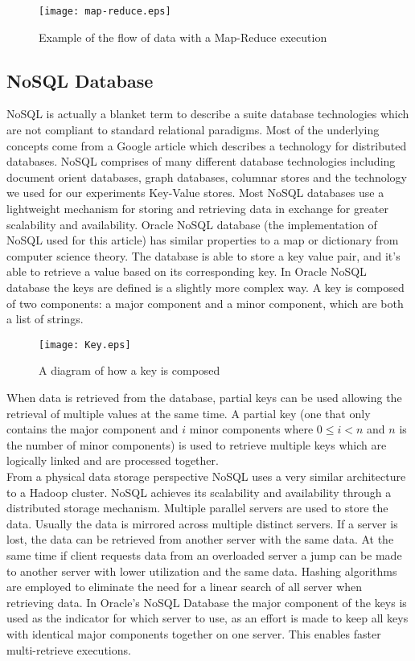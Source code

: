 \documentclass[runningheads]{llncs}
\begin{document}
\begin{figure}
\texttt{[image: map-reduce.eps]}
\caption{Example of the flow of data with a Map-Reduce execution}
\end{figure}

\subsection{NoSQL Database}

NoSQL is actually a blanket term to describe a suite database technologies which are not compliant to standard relational paradigms. Most of the underlying concepts come from a Google article \cite{Google06} which describes a technology for distributed databases. NoSQL comprises of many different database technologies including document orient databases, graph databases, columnar stores and the technology we used for our experiments Key-Value stores. Most NoSQL databases use a lightweight mechanism for storing and retrieving data in exchange for greater scalability and availability. Oracle NoSQL database (the implementation of NoSQL used for this article) has similar properties to a map or dictionary from computer science theory. The database is able to store a key value pair, and it's able to retrieve a value based on its corresponding key. In Oracle NoSQL database the keys are defined is a slightly more complex way. A key is composed of two components: a major component and a minor component, which are both a list of strings. 

\begin{figure}
\texttt{[image: Key.eps]}
\caption{A diagram of how a key is composed}
\end{figure}

When data is retrieved from the database, partial keys can be used allowing the retrieval of multiple values at the same time. A partial key (one that only contains the major component and $i$ minor components where $0 \le i <n$ and $n$ is the number of minor components) is used to retrieve multiple keys which are logically linked and are processed together. \\

From a physical data storage perspective NoSQL uses a very similar architecture to a Hadoop cluster. NoSQL achieves its scalability and availability through a distributed storage mechanism. Multiple parallel servers are used to store the data. Usually the data is mirrored across multiple distinct servers. If a server is lost, the data can be retrieved from another server with the same data. At the same time if client requests data from an overloaded server a jump can be made to another server with lower utilization and the same data. Hashing algorithms are employed to eliminate the need for a linear search of all server when retrieving data. In Oracle's NoSQL Database the major component of the keys is used as the indicator for which server to use, as an effort is made to keep all keys with identical major components together on one server. This enables faster multi-retrieve executions.
\end{document}
